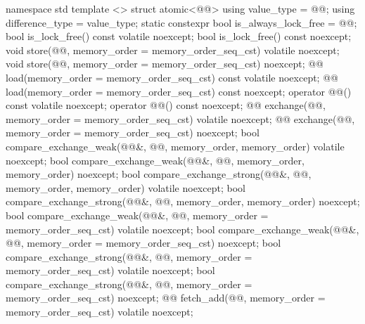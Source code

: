 \begin{codeblock}
namespace std {
  template <> struct atomic<@@> {
    using value_type = @@;
    using difference_type = value_type;
    static constexpr bool is_always_lock_free = @@;
    bool is_lock_free() const volatile noexcept;
    bool is_lock_free() const noexcept;
    void store(@@, memory_order = memory_order_seq_cst) volatile noexcept;
    void store(@@, memory_order = memory_order_seq_cst) noexcept;
    @@ load(memory_order = memory_order_seq_cst) const volatile noexcept;
    @@ load(memory_order = memory_order_seq_cst) const noexcept;
    operator @@() const volatile noexcept;
    operator @@() const noexcept;
    @@ exchange(@@, memory_order = memory_order_seq_cst) volatile noexcept;
    @@ exchange(@@, memory_order = memory_order_seq_cst) noexcept;
    bool compare_exchange_weak(@@&, @@,
                               memory_order, memory_order) volatile noexcept;
    bool compare_exchange_weak(@@&, @@,
                               memory_order, memory_order) noexcept;
    bool compare_exchange_strong(@@&, @@,
                                 memory_order, memory_order) volatile noexcept;
    bool compare_exchange_strong(@@&, @@,
                                 memory_order, memory_order) noexcept;
    bool compare_exchange_weak(@@&, @@,
                               memory_order = memory_order_seq_cst) volatile noexcept;
    bool compare_exchange_weak(@@&, @@,
                               memory_order = memory_order_seq_cst) noexcept;
    bool compare_exchange_strong(@@&, @@,
                               memory_order = memory_order_seq_cst) volatile noexcept;
    bool compare_exchange_strong(@@&, @@,
                               memory_order = memory_order_seq_cst) noexcept;
    @@ fetch_add(@@, memory_order = memory_order_seq_cst) volatile noexcept;
}}
\end{codeblock}
